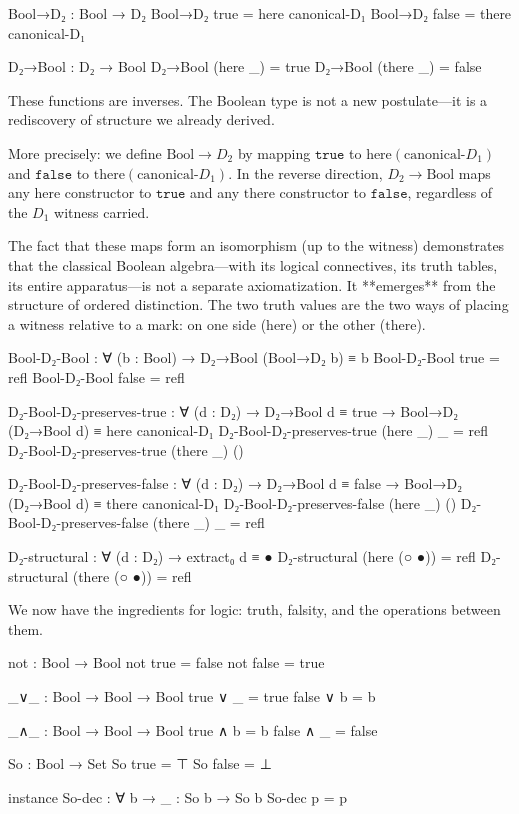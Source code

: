 \documentclass[11pt,a4paper]{book}
\begin{document}
\begin{code}
Bool→D₂ : Bool → D₂
Bool→D₂ true  = here canonical-D₁
Bool→D₂ false = there canonical-D₁

D₂→Bool : D₂ → Bool
D₂→Bool (here _)  = true
D₂→Bool (there _) = false
\end{code}

These functions are inverses. The Boolean type is not a new postulate---it 
is a rediscovery of structure we already derived.

More precisely: we define $\text{Bool} \to D_2$ by mapping $\texttt{true}$ to 
$\text{here}(\text{canonical-}D_1)$ and $\texttt{false}$ to $\text{there}(\text{canonical-}D_1)$. 
In the reverse direction, $D_2 \to \text{Bool}$ maps any $\text{here}$ constructor 
to $\texttt{true}$ and any $\text{there}$ constructor to $\texttt{false}$, regardless 
of the $D_1$ witness carried.

The fact that these maps form an isomorphism (up to the witness) demonstrates that 
the classical Boolean algebra—with its logical connectives, its truth tables, its 
entire apparatus—is not a separate axiomatization. It **emerges** from the structure 
of ordered distinction. The two truth values are the two ways of placing a witness 
relative to a mark: on one side ($\text{here}$) or the other ($\text{there}$).

\begin{code}
Bool-D₂-Bool : ∀ (b : Bool) → D₂→Bool (Bool→D₂ b) ≡ b
Bool-D₂-Bool true  = refl
Bool-D₂-Bool false = refl

D₂-Bool-D₂-preserves-true : ∀ (d : D₂) → D₂→Bool d ≡ true → 
  Bool→D₂ (D₂→Bool d) ≡ here canonical-D₁
D₂-Bool-D₂-preserves-true (here _) _ = refl
D₂-Bool-D₂-preserves-true (there _) ()

D₂-Bool-D₂-preserves-false : ∀ (d : D₂) → D₂→Bool d ≡ false → 
  Bool→D₂ (D₂→Bool d) ≡ there canonical-D₁
D₂-Bool-D₂-preserves-false (here _) ()
D₂-Bool-D₂-preserves-false (there _) _ = refl

D₂-structural : ∀ (d : D₂) → extract₀ d ≡ ●
D₂-structural (here (○ ●))  = refl
D₂-structural (there (○ ●)) = refl
\end{code}

We now have the ingredients for logic: truth, falsity, and the operations 
between them.

\begin{code}
not : Bool → Bool
not true = false
not false = true

_∨_ : Bool → Bool → Bool
true  ∨ _ = true
false ∨ b = b

_∧_ : Bool → Bool → Bool
true ∧ b = b
false ∧ _ = false

So : Bool → Set
So true  = ⊤
So false = ⊥

instance
  So-dec : ∀ {b} → {{_ : So b}} → So b
  So-dec {{p}} = p
\end{code}
\end{document}
